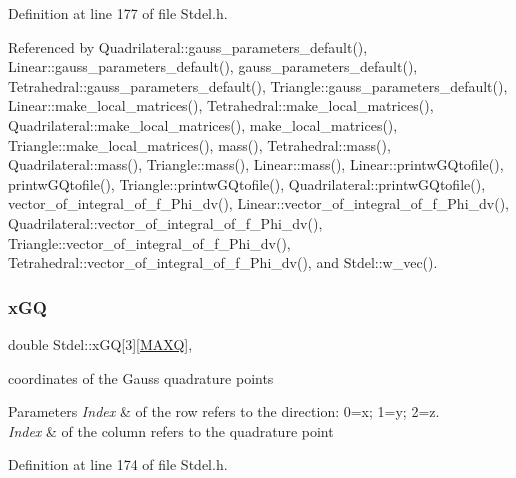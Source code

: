 Definition at line 177 of file Stdel.\+h.



Referenced by Quadrilateral\+::gauss\+\_\+parameters\+\_\+default(), Linear\+::gauss\+\_\+parameters\+\_\+default(), gauss\+\_\+parameters\+\_\+default(), Tetrahedral\+::gauss\+\_\+parameters\+\_\+default(), Triangle\+::gauss\+\_\+parameters\+\_\+default(), Linear\+::make\+\_\+local\+\_\+matrices(), Tetrahedral\+::make\+\_\+local\+\_\+matrices(), Quadrilateral\+::make\+\_\+local\+\_\+matrices(), make\+\_\+local\+\_\+matrices(), Triangle\+::make\+\_\+local\+\_\+matrices(), mass(), Tetrahedral\+::mass(), Quadrilateral\+::mass(), Triangle\+::mass(), Linear\+::mass(), Linear\+::printw\+G\+Qtofile(), printw\+G\+Qtofile(), Triangle\+::printw\+G\+Qtofile(), Quadrilateral\+::printw\+G\+Qtofile(), vector\+\_\+of\+\_\+integral\+\_\+of\+\_\+f\+\_\+\+Phi\+\_\+dv(), Linear\+::vector\+\_\+of\+\_\+integral\+\_\+of\+\_\+f\+\_\+\+Phi\+\_\+dv(), Quadrilateral\+::vector\+\_\+of\+\_\+integral\+\_\+of\+\_\+f\+\_\+\+Phi\+\_\+dv(), Triangle\+::vector\+\_\+of\+\_\+integral\+\_\+of\+\_\+f\+\_\+\+Phi\+\_\+dv(), Tetrahedral\+::vector\+\_\+of\+\_\+integral\+\_\+of\+\_\+f\+\_\+\+Phi\+\_\+dv(), and Stdel\+::w\+\_\+vec().

\mbox{\label{classStdel_adedcb4d4faa12adf348054780a3b2c1a}} 
\subsubsection{\texorpdfstring{x\+GQ}{xGQ}}
{\footnotesize\ttfamily double Stdel\+::x\+GQ\mbox{[}3\mbox{]}\mbox{[}\hyperlink{MyOptions_8h_af708e94d886ba3f59582612949cac702}{M\+A\+XQ}\mbox{]}\hspace{0.3cm}{\ttfamily [protected]}, {\ttfamily [inherited]}}

coordinates of the Gauss quadrature points 
\begin{DoxyParams}{Parameters}
{\em Index} & of the row refers to the direction\+: 0=x; 1=y; 2=z. \\
\hline
{\em Index} & of the column refers to the quadrature point \\
\hline
\end{DoxyParams}


Definition at line 174 of file Stdel.\+h.



